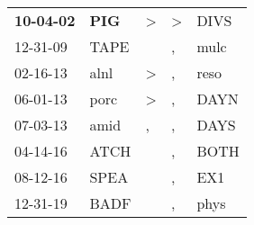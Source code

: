 \begin{supertabular}{p{0.07\textwidth}p{0.06\textwidth}p{0.02\textwidth}p{0.02\textwidth}p{0.06\textwidth}}
 \textbf{10-04-02\textsuperscript{}} &  \textbf{PIG\textsuperscript{}} &  \textgreater &  \textgreater &  DIVS\textsuperscript{} \\
          12-31-09\textsuperscript{} &          TAPE\textsuperscript{} &               &             , &  mulc\textsuperscript{} \\
          02-16-13\textsuperscript{} &          alnl\textsuperscript{} &  \textgreater &             , &  reso\textsuperscript{} \\
          06-01-13\textsuperscript{} &          porc\textsuperscript{} &  \textgreater &             , &  DAYN\textsuperscript{} \\
          07-03-13\textsuperscript{} &          amid\textsuperscript{} &             , &             , &  DAYS\textsuperscript{} \\
          04-14-16\textsuperscript{} &          ATCH\textsuperscript{} &               &             , &  BOTH\textsuperscript{} \\
          08-12-16\textsuperscript{} &          SPEA\textsuperscript{} &               &             , &   EX1\textsuperscript{} \\
          12-31-19\textsuperscript{} &          BADF\textsuperscript{} &               &             , &  phys\textsuperscript{} \\
\end{supertabular}
